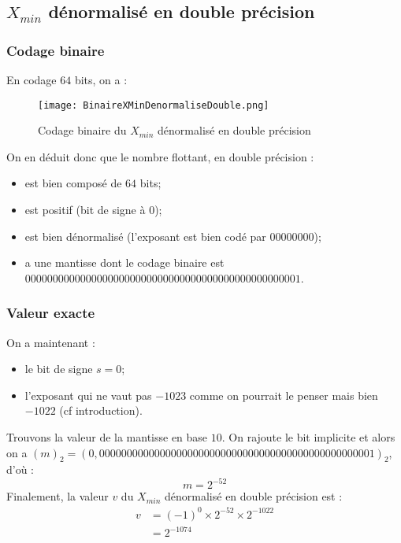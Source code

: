 \documentclass[a4paper, titlepage]{livret} %
\begin{document}
			\subsection{$X_{min}$ dénormalisé en double précision}
				\subsubsection{Codage binaire}
					En codage $64$ bits, on a :
					\begin{figure}[!h]
						\centering
  							\texttt{[image: BinaireXMinDenormaliseDouble.png]}
  							\caption{Codage binaire du $X_{min}$ dénormalisé en double précision}
					\end{figure}

					On en déduit donc que le nombre flottant, en double précision :
					\begin{itemize}
						\item est bien composé de $64$ bits;
						\item est positif (bit de signe à 0);
						\item est bien dénormalisé (l'exposant est bien codé par $00000000$);
						\item a une mantisse dont le codage binaire est $00000000 00000000 0000000 0000000 00000000 00000000 0001$.
					\end{itemize}

				\subsubsection{Valeur exacte}
					On a maintenant : 
					\begin{itemize}
						\item le bit de signe $s = 0$;
						\item l'exposant qui ne vaut pas $-1023$ comme on pourrait le penser mais bien $-1022$ (cf introduction).
					\end{itemize}
					Trouvons la valeur de la mantisse en base $10$.
					On rajoute le bit implicite et alors on a $(m)_{2} = (0,00000000 00000000 0000000 0000000 00000000 00000000 0001)_{2}$, d'où :
					\[
						m = 2^{-52}
					\]
					Finalement, la valeur $v$ du $X_{min}$ dénormalisé en double précision est :
					\[\begin{aligned}
						v & = (-1)^{0} \times 2^{-52} \times 2^{-1022}\\
						  & = 2^{-1074}
					\end{aligned}\]
\end{document}
